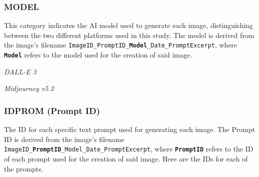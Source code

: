  \subsubsection*{MODEL} 

 This category indicates the AI model used to generate each image, distinguishing between the two different platforms used in this study. The model is derived from the image's filename \texttt{ImageID\_PromptID\_\textbf{Model}\_Date\_PromptExcerpt}, where \texttt{\textbf{Model}} refers to the model used for the creation of said image.

\begin{description}[leftmargin=2.5cm, style=multiline, labelwidth=1.5cm]
\item[1] \textit{DALL-E 3}
\item[2] \textit{Midjourney v5.2}
\end{description}

\subsubsection*{IDPROM (Prompt ID)}
 
The ID for each specific text prompt used for generating each image. The Prompt ID is derived from the image's filename \texttt{ImageID\_\textbf{PromptID}\_Model\_Date\_PromptExcerpt}, where \texttt{\textbf{PromptID}} refers to the ID of each prompt used for the creation of said image.
Here are the IDs for each of the prompts.


